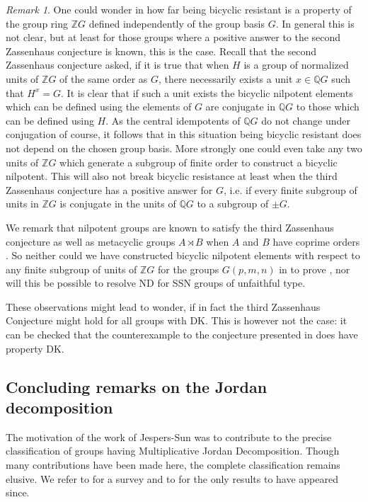 \documentclass[a4paper,10pt]{amsart}
\theoremstyle{definition}
\theoremstyle{remark}
\newtheorem{remark}[lemma]{Remark}
\newcommand{\Q}{{\mathbb Q}}
\begin{document}
\begin{remark}\label{Zassenhaus and bicyclic resitant}
One could wonder in how far being bicyclic resistant is a property of the group ring $\mathbb{Z}G$ defined independently of the group basis $G$. In general this is not clear, but at least for those groups where a positive answer to the second Zassenhaus conjecture is known, this is the case. Recall that the second Zassenhaus conjecture asked, if it is true that when $H$ is a group of normalized units of $\mathbb{Z}G$ of the same order as $G$, there necessarily exists a unit $x \in \Q G$ such that $H^x = G$. It is clear that if such a unit exists the bicyclic nilpotent elements which can be defined using the elements of $G$ are conjugate in $\Q G$ to those which can be defined using $H$. As the central idempotents of $\Q G$ do not change under conjugation of course, it follows that in this situation being bicyclic resistant does not depend on the chosen group basis. More strongly one could even take any two units of $\mathbb{Z}G$ which generate a subgroup of finite order to construct a bicyclic nilpotent. This will also not break bicyclic resistance at least when the third Zassenhaus conjecture has a positive answer for $G$, i.e. if every finite subgroup of units in $\mathbb{Z}G$ is conjugate in the units of $\Q G$ to a subgroup of $\pm G$.

We remark that nilpotent groups are known to satisfy the third Zassenhaus conjecture \cite{Weiss1991} as well as metacyclic groups $A \rtimes B$ when $A$ and $B$ have coprime orders \cite{Valenti94}. So neither could we have constructed bicyclic nilpotent elements with respect to any finite subgroup of units of $\mathbb{Z}G$ for the groups $G(p,m,n)$ in  to prove , nor will this be possible to resolve ND for SSN groups of unfaithful type. 

These observations might lead to wonder, if in fact the third Zassenhaus Conjecture might hold for all groups with DK. This is however not the case: it can be checked that the counterexample to the conjecture presented in \cite{HertweckAnother} does have property DK.
\end{remark}


\subsection{Concluding remarks on the Jordan decomposition}\label{sec:MJD}
The motivation of the work of Jespers-Sun \cite{JespersSun} was to contribute to the precise classification of groups having Multiplicative Jordan Decomposition. Though many contributions have been made here, the complete classification remains elusive. We refer to \cite{HalesPassi17} for a survey and to \cite{WangZhou, KuoSun} for the only results to have appeared since. 
\end{document}
